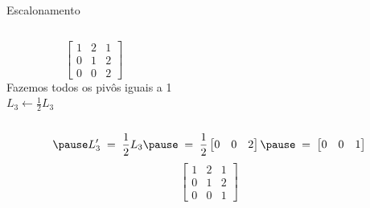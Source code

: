 \begin{resolution}{Escalonamento}
\begin{columns}
  \[\;\;\;
  \begin{bmatrix}
    1 & 2 & 1 \\
    0 & 1 & 2 \\
    0 & 0 & 2
  \end{bmatrix}
  \]
  \pause
{}
  Fazemos todos os pivôs iguais a 1
  \\ \pause
  \(
    L_3 \leftarrow \frac{1}{2} L_3
  \)
\end{columns}
\vspace{-\baselineskip}
\[
  \pause
  L'_3
  \;=\;
 \frac{1}{2} L_3
  \pause
  \;=\;
  \frac{1}{2}
  \begin{bmatrix}
    0 & 0 & 2
  \end{bmatrix}
  \pause
  \;=\;
  \begin{bmatrix}
    0 & 0 & 1
  \end{bmatrix}
\]
\pause
\[
  \begin{bmatrix}
    1 & 2 & 1 \\
    0 & 1 & 2 \\
    0 & 0 & 1
  \end{bmatrix}
\]
\end{resolution}

